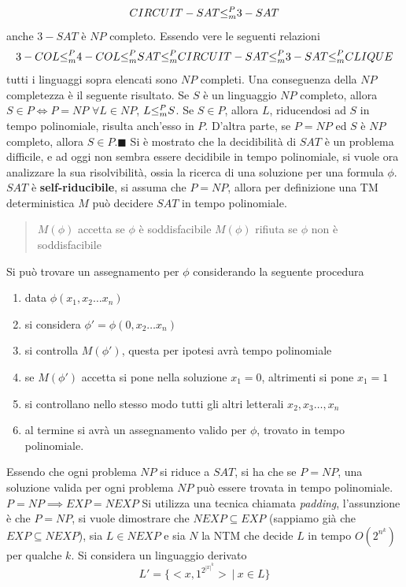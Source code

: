 \documentclass[10pt, letterpaper]{report}
\begin{document}
$$CIRCUIT-SAT{\le_m^P} 3-SAT$$
anche $3-SAT$ è $NP$ completo. Essendo vere le seguenti relazioni 
$$ 
3-COL {\le_m^P} 4-COL {\le_m^P} SAT {\le_m^P} CIRCUIT-SAT {\le_m^P} 3-SAT {\le_m^P} CLIQUE
$$
tutti i linguaggi sopra elencati sono $NP$ completi.\acc 
Una conseguenza della $NP$ completezza è il seguente risultato.\acc 
\teo{} Se $S$ è un linguaggio $NP$ completo, allora $S\in P \iff P=NP$\acc 
\dimo{} $\forall L \in NP$, $L{\le_m^P} S$. Se $S\in P$, allora $L$, riducendosi ad $S$ in tempo polinomiale, risulta anch'esso in $P$. D'altra parte, se $P=NP$ ed $S$ è $NP$ completo, allora $S\in P$.\hfill$\blacksquare$\acc   
Si è mostrato che la decidibilità di $SAT$ è un problema difficile, e ad oggi non sembra essere decidibile in tempo polinomiale, si vuole ora analizzare la sua risolvibilità, ossia la ricerca di una soluzione per una formula $\phi$.\acc 
$SAT$ è \textbf{self-riducibile}, si assuma che $P=NP$, allora per definizione una TM deterministica $M$ può decidere $SAT$ in tempo polinomiale. \begin{quote}
    $M(\phi)$ accetta se $\phi$ è soddisfacibile
    $M(\phi)$ rifiuta se $\phi$ non è soddisfacibile
\end{quote}
Si può trovare un assegnamento per $\phi$ considerando la seguente procedura \begin{enumerate}
    \item data $\phi(x_1,x_2\dots x_n)$
    \item si considera $\phi'=\phi(0,x_2\dots x_n)$
    \item si controlla $M(\phi')$, questa per ipotesi avrà tempo polinomiale 
    \item se $M(\phi')$ accetta si pone nella soluzione $x_1=0$, altrimenti si pone $x_1=1$
    \item si controllano nello stesso modo tutti gli altri letterali $x_2,x_3\dots ,x_n$
    \item al termine si avrà un assegnamento valido per $\phi$, trovato in tempo polinomiale.
\end{enumerate}
Essendo che ogni problema $NP$ si riduce a $SAT$, si ha che se $P=NP$, una soluzione valida per ogni problema $NP$ può essere trovata in tempo polinomiale.\acc 
\teo{} $P=NP\implies EXP=NEXP$\acc 
\dimo{} Si utilizza una tecnica chiamata \textit{padding}, l'assunzione è che $P=NP$, si vuole dimostrare che $NEXP\subseteq EXP$ (sappiamo già che $EXP \subseteq NEXP$), sia $L\in NEXP$ e sia $N$ la NTM che decide $L$ in tempo $O(2^{n^k})$ per qualche $k$.\acc 
Si considera un linguaggio derivato
$$L'=\{<x,1^{2^{|x|^k}}> \ | \ x\in L \} $$
\end{document}
